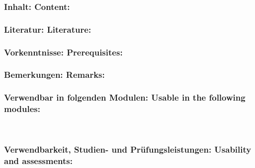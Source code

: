 \documentclass[a4paper,10pt]{article}
\begin{document}
\subsubsection*{\large
    Inhalt:
    Content:
}
\subsubsection*{\large
    Literatur:
    Literature:
}
\subsubsection*{\large
    Vorkenntnisse:
    Prerequisites:
}
\subsubsection*{\large
    Bemerkungen:
    Remarks:
}
\subsubsection*{\large
    Verwendbar in folgenden Modulen:
    Usable in the following modules:
}
\\

\cleardoublepage
\subsubsection*{\large
    Verwendbarkeit, Studien- und Prüfungsleistungen:
    Usability and assessments:
}
\end{document}
